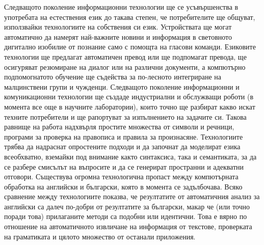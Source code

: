 \begin{multicols}{2}
Следващото поколение информационни технологии ще се усъвършенства в употребата на естествения език до такава степен, че потребителите ще общуват, използвайки технологиите на собствения си език. Устройствата ще могат автоматично да намерят най-важните новини и информация в световното дигитално изобилие от познание само с помощта на гласови команди. Езиковите технологии ще предлагат автоматичен превод или ще подпомагат превода, ще осигуряват резюмиране на диалог или на различни документи, а компютърно подпомогнатото обучение ще съдейства за по-лесното интегриране на малцинствени групи и чужденци.  Следващото поколение информационни и комуникационни технологии ще създаде индустриални и обслужващи роботи (в момента все още в научните лаборатории), които точно ще разбират какво искат техните потребители и ще рапортуват за изпълнението на задачите си. Такова равнище на работа надхвърля простите множества от символи и речници, програми за проверка на правописа и правила за произнасяне. Технологиите трябва да надраснат опростените подходи и да започнат да моделират езика всеобхватно, вземайки под внимание както синтаксиса, така и семантиката, за да се разбере смисълът на въпросите и да се генерират пространни и адекватни отговори.  Съществува огромна технологична пропаст между компютърната обработка на английски и български, която в момента се задълбочава. Всяко сравнение между технологиите показва, че резултатите от автоматичния анализ за английски са далеч по-добри от резултатите за български, макар че (или точно поради това) прилаганите методи са подобни или идентични. Това е вярно по отношение на автоматичното извличане на информация от текстове, проверката на граматиката и цялото множество от останали приложения.


\end{multicols}
